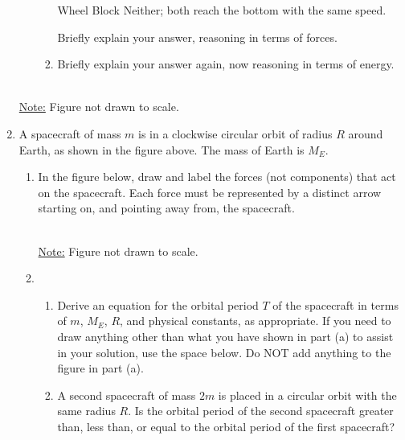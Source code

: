 \documentclass{../../../oss-apphys}
\begin{document}
\begin{enumerate}
\begin{enumerate}
\begin{enumerate}
      \vspace{.1in}
      \underline{\hspace{.3in}} Wheel\hspace{.2in}
      \underline{\hspace{.3in}} Block\hspace{.2in}
      \underline{\hspace{.3in}} Neither; both reach the bottom with the same
      speed.

      \vspace{.1in}Briefly explain your answer, reasoning in terms of forces.
      
    \item Briefly explain your answer again, now reasoning in terms of energy.
    \end{enumerate}
  \end{enumerate}

  \newpage
  
  \begin{center}
    \\
    \underline{Note:} Figure not drawn to scale.
  \end{center}
\item A spacecraft of mass $m$ is in a clockwise circular orbit of radius $R$
  around Earth, as shown in the figure above. The mass of Earth is $M_E$.
  \begin{enumerate}
  \item In the figure below, draw and label the forces (not components) that
    act on the spacecraft. Each force must be represented by a distinct arrow
    starting on, and pointing away from, the spacecraft.
    \begin{center}
      \\
      \underline{Note:} Figure not drawn to scale.
  \end{center}

  \item
    \begin{enumerate}
    \item Derive an equation for the orbital period $T$ of the spacecraft in
      terms of $m$, $M_E$, $R$, and physical constants, as appropriate. If you
      need to draw anything other than what you have shown in part (a) to
      assist in your solution, use the space below. Do NOT add anything to the
      figure in part (a).
    \item A second spacecraft of mass $2m$ is placed in a circular orbit with
      the same radius $R$. Is the orbital period of the second spacecraft
      greater than, less than, or equal to the orbital period of the first
      spacecraft?


\end{enumerate}
\end{enumerate}
\end{enumerate}
\end{document}
